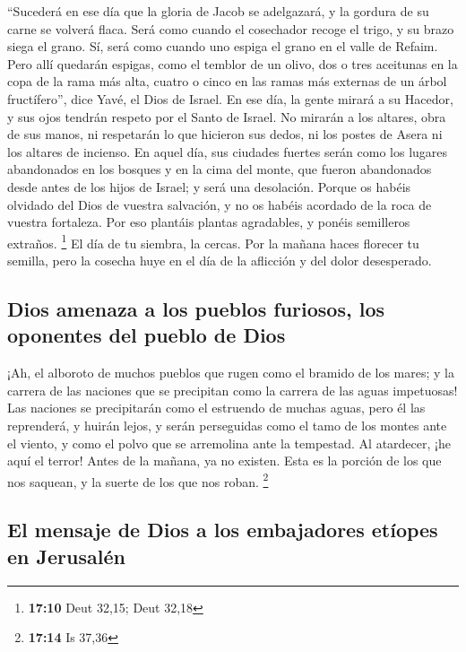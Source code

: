  ``Sucederá en ese día que la gloria de Jacob se
adelgazará, y la gordura de su carne se volverá flaca. 
Será como cuando el cosechador recoge el trigo, y su brazo siega el
grano. Sí, será como cuando uno espiga el grano en el valle de Refaim.
 Pero allí quedarán espigas, como el temblor de un olivo,
dos o tres aceitunas en la copa de la rama más alta, cuatro o cinco en
las ramas más externas de un árbol fructífero'', dice Yavé, el Dios de
Israel.  En ese día, la gente mirará a su Hacedor, y sus
ojos tendrán respeto por el Santo de Israel.  No mirarán a
los altares, obra de sus manos, ni respetarán lo que hicieron sus dedos,
ni los postes de Asera ni los altares de incienso.  En
aquel día, sus ciudades fuertes serán como los lugares abandonados en
los bosques y en la cima del monte, que fueron abandonados desde antes
de los hijos de Israel; y será una desolación.  Porque os
habéis olvidado del Dios de vuestra salvación, y no os habéis acordado
de la roca de vuestra fortaleza. Por eso plantáis plantas agradables, y
ponéis semilleros extraños. \footnote{\textbf{17:10} Deut 32,15; Deut
  32,18}  El día de tu siembra, la cercas. Por la mañana
haces florecer tu semilla, pero la cosecha huye en el día de la
aflicción y del dolor desesperado.

\hypertarget{dios-amenaza-a-los-pueblos-furiosos-los-oponentes-del-pueblo-de-dios}{%
\subsection{Dios amenaza a los pueblos furiosos, los oponentes del
pueblo de
Dios}\label{dios-amenaza-a-los-pueblos-furiosos-los-oponentes-del-pueblo-de-dios}}

 ¡Ah, el alboroto de muchos pueblos que rugen como el
bramido de los mares; y la carrera de las naciones que se precipitan
como la carrera de las aguas impetuosas!  Las naciones se
precipitarán como el estruendo de muchas aguas, pero él las reprenderá,
y huirán lejos, y serán perseguidas como el tamo de los montes ante el
viento, y como el polvo que se arremolina ante la tempestad.
 Al atardecer, ¡he aquí el terror! Antes de la mañana, ya
no existen. Esta es la porción de los que nos saquean, y la suerte de
los que nos roban. \footnote{\textbf{17:14} Is 37,36}

\hypertarget{el-mensaje-de-dios-a-los-embajadores-etuxedopes-en-jerusaluxe9n}{%
\subsection{El mensaje de Dios a los embajadores etíopes en
Jerusalén}\label{el-mensaje-de-dios-a-los-embajadores-etuxedopes-en-jerusaluxe9n}}

